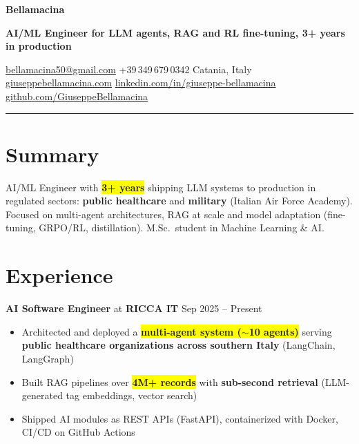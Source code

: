 \documentclass[10pt,a4paper]{article}
\newcommand{\kpi}[1]{{\setlength{\fboxsep}{1.2pt}\colorbox{mark}{\textbf{#1}}}}
\newcommand{\tech}[1]{{\color{muted}(#1)}}
\newcommand{\role}[3]{{\large\textbf{#1}} {\color{muted}at} {\fontsize{11}{13}\selectfont\textbf{#2}} \hfill {\color{muted}#3}\par}
\newcommand{\sep}{\enspace{\color{rule}|}\enspace}
\begin{document}
{\fontsize{24}{28} \textbf{Bellamacina}} \par\vspace{5pt}
{\large\color{cobalt}\textbf{AI/ML Engineer for LLM agents, RAG and RL fine-tuning, 3+ years in production}} \par\vspace{5pt}
{\color{muted}
\href{mailto:bellamacina50@gmail.com}{bellamacina50@gmail.com} \sep +39\,349\,679\,0342 \sep Catania, Italy \\[1pt]
\href{https://giuseppebellamacina.com}{giuseppebellamacina.com} \sep
\href{https://www.linkedin.com/in/giuseppe-bellamacina}{linkedin.com/in/giuseppe-bellamacina} \sep
\href{https://github.com/GiuseppeBellamacina}{github.com/GiuseppeBellamacina}}
\par\vspace{6pt}
{\color{cobalt}\rule{\linewidth}{1.8pt}}

\section{Summary}
AI/ML Engineer with \kpi{3+ years} shipping LLM systems to production in regulated sectors: \textbf{public healthcare} and \textbf{military} (Italian Air Force Academy). Focused on multi-agent architectures, RAG at scale and model adaptation (fine-tuning, GRPO/RL, distillation). M.Sc.\ student in Machine Learning \& AI.

\section{Experience}

\role{AI Software Engineer}{RICCA IT}{Sep 2025 -- Present}
\begin{itemize}
  \item Architected and deployed a \kpi{multi-agent system ($\sim$10 agents)} serving \textbf{public healthcare organizations across southern Italy} \tech{LangChain, LangGraph}
  \item Built RAG pipelines over \kpi{4M+ records} with \textbf{sub-second retrieval} \tech{LLM-generated tag embeddings, vector search}
  \item Shipped AI modules as REST APIs \tech{FastAPI}, containerized with Docker, CI/CD on GitHub Actions
\end{itemize}
\end{document}
